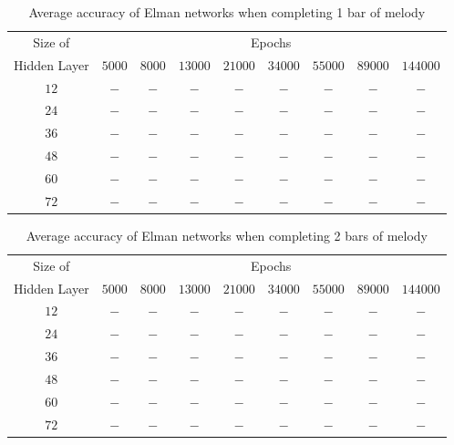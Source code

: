 \documentclass[ author={Stephen Livermore-Tozer},
				supervisor={Dr. Peter Flach},
				degree={MEng},
				title={Algorithmic Co-composition Using Machine Learning},
				subtitle={},
				type={research},
				year={2016} ]{dissertation}
\begin{document}
	\begin{table}[htp]
		\begin{center}
			\begin{tabular}{ccccccccc}
				\toprule
				Size of& \multicolumn{8}{c}{Epochs}\\
				\cline{2-9}
				Hidden Layer& $5000$ & $8000$ & $13000$ & $21000$ & $34000$ & $55000$ & $89000$ & $144000$\\
				\hline
				$12$ & $-$ & $-$ & $-$ & $-$ & $-$ & $-$ & $-$ & $-$\\
				$24$ & $-$ & $-$ & $-$ & $-$ & $-$ & $-$ & $-$ & $-$\\
				$36$ & $-$ & $-$ & $-$ & $-$ & $-$ & $-$ & $-$ & $-$\\
				$48$ & $-$ & $-$ & $-$ & $-$ & $-$ & $-$ & $-$ & $-$\\
				$60$ & $-$ & $-$ & $-$ & $-$ & $-$ & $-$ & $-$ & $-$\\
				$72$ & $-$ & $-$ & $-$ & $-$ & $-$ & $-$ & $-$ & $-$\\
				\bottomrule
			\end{tabular}
		\end{center}
		\caption{Average accuracy of Elman networks when completing 1 bar of melody}
		\label{tab:elman-1-bar-results}
	\end{table}
	
	\begin{table}[htp]
		\begin{center}
			\begin{tabular}{ccccccccc}
				\toprule
				Size of& \multicolumn{8}{c}{Epochs}\\
				\cline{2-9}
				Hidden Layer& $5000$ & $8000$ & $13000$ & $21000$ & $34000$ & $55000$ & $89000$ & $144000$\\
				\hline
				$12$ & $-$ & $-$ & $-$ & $-$ & $-$ & $-$ & $-$ & $-$\\
				$24$ & $-$ & $-$ & $-$ & $-$ & $-$ & $-$ & $-$ & $-$\\
				$36$ & $-$ & $-$ & $-$ & $-$ & $-$ & $-$ & $-$ & $-$\\
				$48$ & $-$ & $-$ & $-$ & $-$ & $-$ & $-$ & $-$ & $-$\\
				$60$ & $-$ & $-$ & $-$ & $-$ & $-$ & $-$ & $-$ & $-$\\
				$72$ & $-$ & $-$ & $-$ & $-$ & $-$ & $-$ & $-$ & $-$\\
				\bottomrule
			\end{tabular}
		\end{center}
		\caption{Average accuracy of Elman networks when completing 2 bars of melody}
		\label{tab:elman-2-bar-results}
	\end{table}
	
\end{document}
